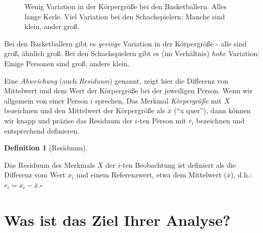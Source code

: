 \documentclass[
  letterpaper,
]{scrbook}
\theoremstyle{definition}
\theoremstyle{definition}
\theoremstyle{definition}
\newtheorem{definition}{Definition}[chapter]
\theoremstyle{remark}
\begin{document}
\begin{figure}


\caption{\label{fig-groesse}Wenig Variation in der Körpergröße bei den
Basketballern. Alles lange Kerle. Viel Variation bei den Schachspielern:
Manche sind klein, ander groß.}

\end{figure}%

Bei den Basketballern gibt es \emph{geringe} Variation in der
Körpergröße - alle sind groß, ähnlich groß. Bei den Schachspielern gibt
es (im Verhältnis) \emph{hohe} Variation: Einige Personen sind groß,
andere klein.

Eine \emph{Abweichung} (auch \emph{Residuum}) genannt, zeigt hier die
Differenz von Mittelwert und dem Wert der Körpergröße bei der jeweiligen
Person. Wenn wir allgemein von einer Person \(i\) sprechen, Das Merkmal
\emph{Körpergröße} mit \(X\) bezeichnen und den Mittelwert der
Körpergröße als \(\bar{x}\) (\enquote{x quer}), dann können wir knapp
und präzise das Residuum der \(i\)-ten Person mit \(r_i\) bezeichnen und
entsprechend definieren.

\begin{definition}[Residuum]\protect\hypertarget{def-residuum}{}\label{def-residuum}

Das Residuum des Merkmals \(X\) der \(i\)-ten Beobachtung ist definiert
als die Differenz vom Wert \(x_i\) und einem Referenzwert, etwa dem
Mittelwert (\(\bar{x}\)), d.h.: \(r_i = x_i - \bar{x}.\square\)

\end{definition}

\section{Was ist das Ziel Ihrer
Analyse?}\label{was-ist-das-ziel-ihrer-analyse}
\end{document}
